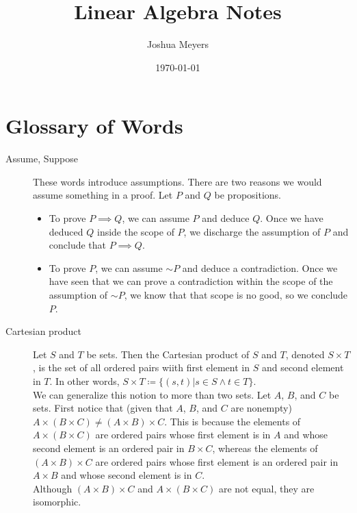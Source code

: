 \documentclass[12pt]{article}
\title{Linear Algebra Notes}
\author{Joshua Meyers}
\newcommand*{\oldneg}{\mathord{\sim}}
\begin{document}
\date{\today}
\maketitle


\section{Glossary of Words}

\begin{description}

  \item[Assume, Suppose] These words introduce assumptions.  There are
    two reasons we would assume something in a proof.  Let $P$ and $Q$
    be propositions.
    \begin{itemize}
      \item To prove $P\implies Q$, we can assume $P$ and deduce $Q$.
        Once we have deduced $Q$ inside the scope of $P$, we discharge
        the assumption of $P$ and conclude that $P\implies Q$.
      \item To prove $P$, we can assume $\oldneg P$ and deduce a
        contradiction.  Once we have seen that we can prove a
        contradiction within the scope of the assumption of $\oldneg
        P$, we know that that scope is no good, so we conclude $P$.
    \end{itemize}
  
  \item[Cartesian product] Let $S$ and $T$ be sets.  Then the
    Cartesian product of $S$ and $T$, denoted $S\times T$, is the set
    of all ordered pairs wiith first element in $S$ and second element
    in $T$.  In other words, $S\times T\coloneqq \{(s,t)|s\in S\wedge
    t\in T\}$.\\

    We can generalize this notion to more than two sets.  Let $A$,
    $B$, and $C$ be sets.  First notice that (given that $A$, $B$, and
    $C$ are nonempty) $A\times (B\times C)\neq (A\times B)\times C$.
    This is because the elements of $A\times (B\times C)$ are ordered
    pairs whose first element is in $A$ and whose second element is an
    ordered pair in $B\times C$, whereas the elements of $(A\times
    B)\times C$ are ordered pairs whose first element is an ordered
    pair in $A\times B$ and whose second element is in $C$.\\

    Although $(A\times B)\times C$ and $A\times (B\times C)$ are not
    equal, they are isomorphic. \\


\end{description}
\end{document}
